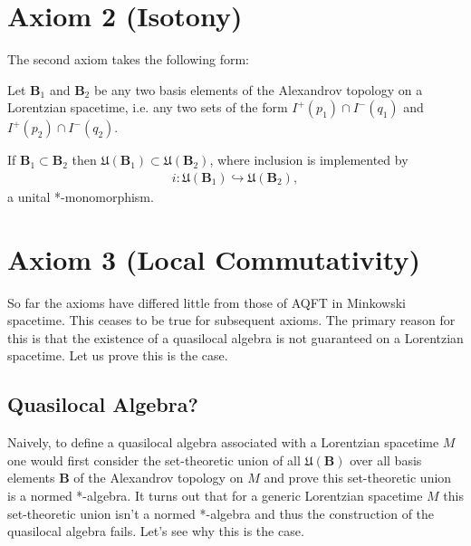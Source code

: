 \section{Axiom 2 (Isotony)}\label{sctn:axiom-2-(isotony)}
The second axiom takes the following form:

\begin{axiom}[Isotony]
    Let $\mathbf{B}_1$ and $\mathbf{B}_2$ be any two basis elements of the Alexandrov topology on a Lorentzian spacetime, i.e. any two sets of the form $I^+(p_1) \cap I^-(q_1)$ and $I^+(p_2) \cap I^-(q_2)$.
    
    If $\mathbf{B}_1 \subset \mathbf{B}_2$ then $\mathfrak{U}(\mathbf{B}_1) \subset \mathfrak{U}(\mathbf{B}_2)$, where inclusion is implemented by
    \begin{align}
        i : \mathfrak{U}(\mathbf{B}_1) \hookrightarrow \mathfrak{U}(\mathbf{B}_2),
    \end{align}
    a unital *-monomorphism.
\end{axiom}


\section{Axiom 3 (Local Commutativity)}\label{sctn:axiom-3-(local-commutativity)}
So far the axioms have differed little from those of AQFT in Minkowski spacetime. This ceases to be true for subsequent axioms. The primary reason for this is that the existence of a quasilocal algebra is not guaranteed on a Lorentzian spacetime. Let us prove this is the case.

\subsection{Quasilocal Algebra?}
Naively, to define a quasilocal algebra associated with a Lorentzian spacetime $M$ one would first consider the set-theoretic union of all $\mathfrak{U}(\mathbf{B})$ over all basis elements $\mathbf{B}$ of the Alexandrov topology on $M$ and prove this set-theoretic union is a normed *-algebra. It turns out that for a generic Lorentzian spacetime $M$ this set-theoretic union isn't a normed *-algebra and thus the construction of the quasilocal algebra fails. Let's see why this is the case.

